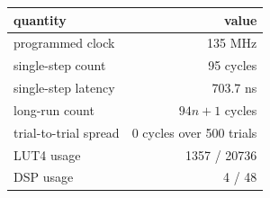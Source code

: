 \begin{tabular}{@{}lr@{}}
\toprule
quantity & value \\
\midrule
programmed clock & 135 MHz \\
single-step count & 95 cycles \\
single-step latency & 703.7 ns \\
long-run count & $94n + 1$ cycles \\
trial-to-trial spread & 0 cycles over 500 trials \\
LUT4 usage & 1357 / 20736 \\
DSP usage & 4 / 48 \\
\bottomrule
\end{tabular}
